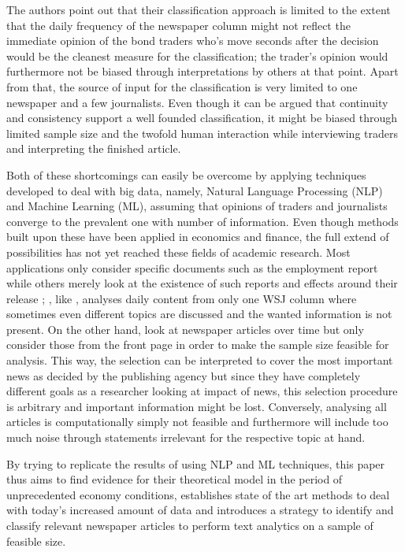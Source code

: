 The authors point out that their classification approach is limited to the extent that the daily frequency of the newspaper column might not reflect the immediate opinion of the bond traders who's move seconds after the decision would be the cleanest measure for the classification; the trader's opinion would furthermore not be biased through interpretations by others at that point. Apart from that, the source of input for the classification is very limited to one newspaper and a few journalists. Even though it can be argued that continuity and consistency support a well founded classification, it might be biased through limited sample size and the twofold human interaction while interviewing traders and interpreting the finished article. 

Both of these shortcomings can easily be overcome by applying techniques developed to deal with big data, namely, Natural Language Processing (NLP) and Machine Learning (ML), assuming that opinions of traders and journalists converge to the prevalent one with number of information. Even though methods built upon these have been applied in economics and finance, the full extend of possibilities has not yet reached these fields of academic research. Most applications only consider specific documents such as the employment report \parencite{Hautsch.2002,Hess.2004} while others merely look at the existence of such reports and effects around their release \parencite{Bomfim.2003,Hautsch.2011,Lucca.2015}; \textcite{Tetlock.2007}, like \textcite{Ellingsen.2001}, analyses daily content from only one WSJ column where sometimes even different topics are discussed and the wanted information is not present. On the other hand, \textcite{Manela.2017} look at newspaper articles over time but only consider those from the front page in order to make the sample size feasible for analysis. This way, the selection can be interpreted to cover the most important news as decided by the publishing agency but since they have completely different goals as a researcher looking at impact of news, this selection procedure is arbitrary and important information might be lost. Conversely, analysing all articles is computationally simply not feasible and furthermore will include too much noise through statements irrelevant for the respective topic at hand.

By trying to replicate the results of \textcite{Ellingsen.2001} using NLP and ML techniques, this paper thus aims to find evidence for their theoretical model in the period of unprecedented economy conditions, establishes state of the art methods to deal with today's increased amount of data and introduces a strategy to identify and classify relevant newspaper articles to perform text analytics on a sample of feasible size. 

